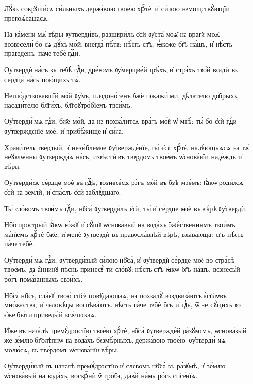 \hKv Лꙋ́къ сокрꙋши́сѧ си́льныхъ держа́вою твое́ю хрⷭ҇тѐ, и҆  си́лою немощствꙋ́ющїи препоѧ́сашасѧ. 

\hKv На ка́мени мѧ̀ вѣ́ры ᲂу҆тверди́въ, разшири́лъ є҆сѝ  ᲂу҆ста̀ моѧ̑ на врагѝ моѧ̑. возвесели́ бо сѧ дꙋ́хъ мо́й,  внегда̀ пѣ́ти: нѣ́сть ст҃ъ, ꙗ҆́коже бг҃ъ на́шъ, и҆  нѣ́сть пра́веденъ, па́че тебѐ гдⷭ҇и. 
%

\hKv Оу҆твердѝ на́съ въ тебѣ̀ гдⷭ҇и,  дре́вомъ ᲂу҆мерщве́й грѣ́хъ, и҆ стра́хъ тво́й всадѝ въ  сердца̀ на́съ пою́щихъ тѧ̀.  
%

\hKv Непло́дствовавшїй мо́й ᲂу҆́мъ, плодоно́сенъ бж҃е покажи́  ми, дѣ́лателю до́брыхъ, насади́телю бл҃ги́хъ,  бл҃гоꙋтро́бїемъ твои́мъ. 

\hKv Оу҆тверди́ мѧ гдⷭ҇и, бж҃е мо́й, да не похва́литсѧ вра́гъ  мо́й ѡ҆ мнѣ̀: ты́ бо є҆сѝ гдⷭ҇и ᲂу҆твержде́нїе моѐ, и҆  прибѣ́жище и҆ си́ла.  

\hKv Храни́тель тве́рдый, и҆ незы́блемое ᲂу҆твержде́нїе, ты̀  є҆сѝ хрⷭ҇тѐ, надѣ́ющыѧсѧ на тѧ̀ неꙋклѡ́нны ᲂу҆твержда́ѧ  на́съ, и҆звѣстѝ въ тве́рдомъ твое́мъ ѡ҆снова́нїи наде́жды  и҆ вѣ́ры. 

\hKv Оу҆тверди́сѧ се́рдце моѐ въ гдⷭ҇ѣ, вознесе́сѧ ро́гъ мо́й  въ бз҃ѣ мое́мъ: ꙗ҆́кѡ роди́лсѧ є҆сѝ на землѝ, и҆  спа́слъ є҆сѝ заблꙋ́дшаго.  

\hKv Ты̀ сло́вомъ твои́мъ гдⷭ҇и, нб҃са̀ ᲂу҆тверди́лъ є҆сѝ, ты̀  и҆ се́рдце моѐ въ вѣ́рѣ ᲂу҆твердѝ. 

\hKv Нб҃о простры́й ꙗ҆́кѡ ко́жꙋ и҆ сꙋ́шꙋ ѡ҆снова́вый на вода́хъ  бж҃е́ственнымъ твои́мъ ма́нїемъ хрⷭ҇тѐ бж҃е, и҆ менѐ  ᲂу҆твердѝ въ правосла́внѣй вѣ́рѣ, взыва́юща: ст҃ъ  нѣ́сть па́че тебѐ.  

\hKv Оу҆тверди́ мѧ гдⷭ҇и, ᲂу҆тверди́вый си́лою нб҃са̀, и҆  ᲂу҆твердѝ се́рдце моѐ во стра́сѣ твое́мъ, да а҆́ннинꙋ  пѣ́снь принесꙋ́ ти сло́вꙋ: нѣ́сть ст҃ъ ꙗ҆́кѡ бг҃ъ на́шъ,  вознесы́й ро́гъ пома́занныхъ свои́хъ. 

\hKv Нб҃са̀ нб҃съ, сла́вꙋ твою̀ сп҃сѐ повѣ̑дающаѧ, на похвалꙋ̀  воздвиза́ютъ а҆́гг҃лѡвъ мно́жєства, и҆ человѣ́цы  воспѣва́ютъ. нѣ́сть па́че тебѐ бг҃ъ и҆ гдⷭ҇ь, ѿ не  сꙋ́щихъ во є҆́же бы́ти приведы́й всѧ́чєскаѧ. 

\hKv И҆́же въ нача́лѣ премꙋ́дростїю твое́ю хрⷭ҇тѐ, нб҃са̀  ᲂу҆твержде́й ра́зꙋмомъ, ѡ҆снова́вый же зе́млю бг҃олѣ́пнѡ  на вода́хъ безмѣ́рныхъ, держа́вою твое́ю, ᲂу҆тверди́ мѧ  молю́сѧ, въ тве́рдомъ ѡ҆снова́нїи вѣ́ры. 

\hKv Оу҆тверди́вый въ нача́лѣ премꙋ́дростїю и҆ сло́вомъ нб҃са̀  въ ра́зꙋмѣ, и҆ зе́млю ѡ҆снова́вый на вода́хъ, воскрⷭ҇нѝ  ѿ гро́ба, даѧ́й на́мъ ро́гъ сп҃се́нїѧ.  
%

